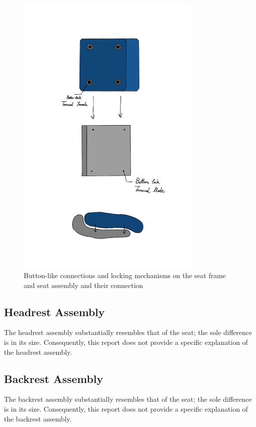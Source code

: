 \begin{figure}[!htp]
    \centering
    \includegraphics[width=0.8\textwidth]{images/button lock.png}
    \caption{Button-like connections and locking mechanisms on the seat frame and seat assembly and their connection}
    \label{fig:seat-connection}
\end{figure}

\subsection{Headrest Assembly}
The headrest assembly substantially resembles that of the seat; the sole difference is in its size. Consequently, this report does not provide a specific explanation of the headrest assembly.

\subsection{Backrest Assembly}
The backrest assembly substantially resembles that of the seat; the sole difference is in its size. Consequently, this report does not provide a specific explanation of the backrest assembly.

